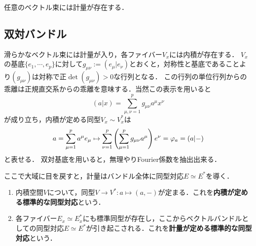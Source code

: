 \documentclass[uplatex,dvipdfmx]{jsreport}
\begin{document}
\begin{theorem}
    任意のベクトル束には計量が存在する．
\end{theorem}

\subsection{双対バンドル}

\begin{tcolorbox}[colframe=ForestGreen, colback=ForestGreen!10!white,breakable,colbacktitle=ForestGreen!40!white,coltitle=black,fonttitle=\bfseries\sffamily,
    title=]
    滑らかなベクトル束には計量が入り，各ファイバー$V_x$には内積が存在する．
    $V_x$の基底$\{e_1,\cdots,e_p\}$に対して$g_{\mu\nu}:=(e_\mu|e_\nu)$とおくと，対称性と基底であることより$(g_{\mu\nu})$は対称で正$\det(g_{\mu\nu})>0$な行列となる．
    この行列の単位行列からの乖離は正規直交系からの乖離を意味する．当然この表示を用いると
    \[(a|x)=\sum_{\mu,\nu=1}^pg_{\mu\nu}a^\mu x^\nu\]
    が成り立ち，内積が定める同型$V_x\sim V_x^*$は
    \[a=\sum^p_{\mu=1}a^\mu e_\mu\mapsto\sum^p_{\nu=1}\left(\sum^p_{\mu=1}g_{\mu\nu}a^\mu\right)e^\nu=\varphi_a=(a|-)\]
    と表せる．
    双対基底を用いると，無理やりFourier係数を抽出出来る．
    
    ここで大域に目を戻すと，計量はバンドル全体に同型対応$E\simeq E^*$を導く．
\end{tcolorbox}

\begin{definition}\mbox{}
    \begin{enumerate}
        \item 内積空間$V$について，同型$V\to V^*:a\mapsto(a,-)$が定まる．これを\textbf{内積が定める標準的な同型対応}という．
        \item 各ファイバー$E_x\simeq E_x^*$にも標準同型が存在し，ここからベクトルバンドルとしての同型対応$E\simeq E^*$が引き起こされる．これを\textbf{計量が定める標準的な同型対応}という．
    \end{enumerate}
\end{definition}
\end{document}
